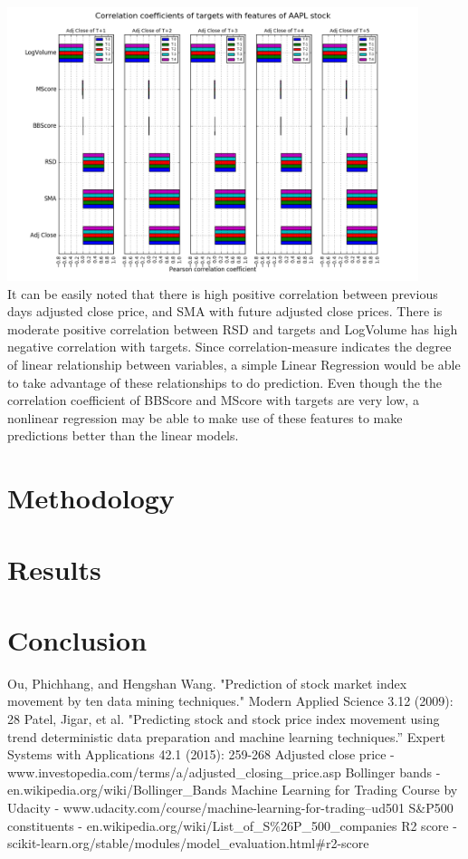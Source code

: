 \documentclass[10pt]{report}
\begin{document}
\includegraphics[width=12cm]{plots/corrcoeffs.png}\\
It can be easily noted that there is high positive correlation between previous days adjusted close price, and SMA with future adjusted close prices. There is moderate positive correlation between RSD and targets and LogVolume has high negative correlation with targets. Since correlation-measure indicates the degree of linear relationship between variables, a simple Linear Regression would be able to take advantage of these relationships to do prediction. Even though the the correlation coefficient of BBScore and MScore with targets are very low, a nonlinear regression may be able to make use of these features to make predictions better than the linear models.

\section{Methodology}

\section{Results}

\section{Conclusion}

\begin{thebibliography}{}

Ou, Phichhang, and Hengshan Wang. "Prediction of stock market index movement by ten data mining techniques." Modern Applied Science 3.12 (2009): 28
Patel, Jigar, et al. "Predicting stock and stock price index movement using trend deterministic data preparation and machine learning techniques.” Expert Systems with Applications 42.1 (2015): 259-268
Adjusted close price - www.investopedia.com/terms/a/adjusted\_closing\_price.asp
Bollinger bands - en.wikipedia.org/wiki/Bollinger\_Bands
Machine Learning for Trading Course by Udacity - www.udacity.com/course/machine-learning-for-trading--ud501
S\&P500 constituents - en.wikipedia.org/wiki/List\_of\_S\%26P\_500\_companies
R2 score - scikit-learn.org/stable/modules/model\_evaluation.html\#r2-score

\end{thebibliography}
\end{document}
